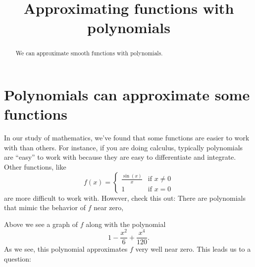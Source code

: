 \documentclass{ximera}
\title[Dig-In:]{Approximating functions with polynomials}
\begin{document}
\begin{abstract}
We can approximate smooth functions with polynomials.
\end{abstract}
\maketitle


\section{Polynomials can approximate some functions}

In our study of mathematics, we've found that some functions are
easier to work with than others. For instance, if you are doing
calculus, typically polynomials are ``easy'' to work with because they
are easy to differentiate and integrate. Other functions, like
\[
f(x) =
\begin{cases}
  \frac{\sin(x)}{x} &\text{if $x\ne 0$}\\
  1 &\text{if $x=0$}
\end{cases}
\]
are more difficult to work with. However, check this out: There are
polynomials that mimic the behavior of $f$ near zero,
\begin{image}
\end{image}
Above we see a graph of $f$ along with the polynomial
\[
1-\frac{x^2}{6}+\frac{x^4}{120}.
\]
As we see, this polynomial approximates $f$ very well near zero. This
leads us to a question:
\end{document}
